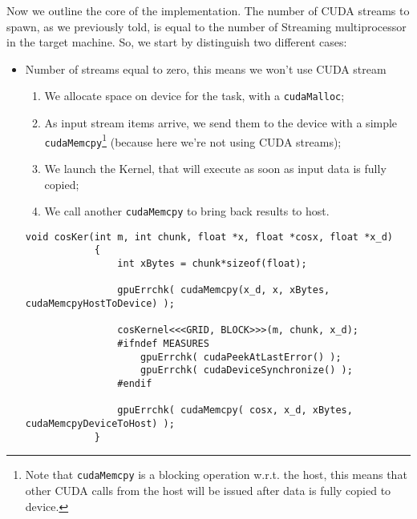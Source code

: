 	Now we outline the core of the implementation. The number of CUDA streams to spawn, as we previously told, is equal to the number of Streaming multiprocessor in the target machine. So, we start by distinguish two different cases:
	\begin{itemize}
		\item Number of streams equal to zero, this means we won't use CUDA stream
		\begin{enumerate}
			\item We allocate space on device for the task, with a \texttt{cudaMalloc};
			\item As input stream items arrive, we send them to the device with a simple \texttt{cudaMemcpy}\footnote{Note that \texttt{cudaMemcpy} is a blocking operation w.r.t. the host, this means that other CUDA calls from the host will be issued after data is fully copied to device.} (because here we're not using CUDA streams);
			\item We launch the Kernel, that will execute as soon as input data is fully copied;
			\item We call another \texttt{cudaMemcpy} to bring back results to host.
		\end{enumerate}
		
			\begin{lstlisting}[label=lst:noStr, caption={Data transfer host/device and kernel call, NO-CUDA Streams version}]
			void cosKer(int m, int chunk, float *x, float *cosx, float *x_d)
			{   
				int xBytes = chunk*sizeof(float);
				
				gpuErrchk( cudaMemcpy(x_d, x, xBytes, cudaMemcpyHostToDevice) ); 
				
				cosKernel<<<GRID, BLOCK>>>(m, chunk, x_d);
				#ifndef MEASURES
					gpuErrchk( cudaPeekAtLastError() );
					gpuErrchk( cudaDeviceSynchronize() );
				#endif   
				
				gpuErrchk( cudaMemcpy( cosx, x_d, xBytes, cudaMemcpyDeviceToHost) );
			}
			\end{lstlisting}
		

\end{itemize}
